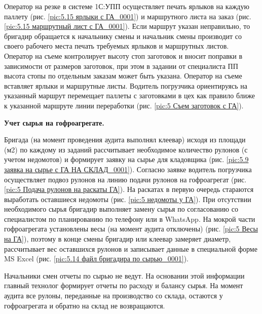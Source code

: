 Оператор на резке в системе 1С:УПП осуществляет печать ярлыков на каждую паллету (рис. \ref{pic:5.15 ярлыки с ГА_0001}) и маршрутного листа на заказ (рис. \ref{pic:5.15 маршрутный лист с ГА_0001}). Если маршрут указан неправильно, то бригадир обращается к начальнику смены и начальник смены производит со своего рабочего места печать требуемых ярлыков и маршрутных листов. Оператор на съеме контролирует высоту стоп заготовок и вносит поправки в зависимости от размеров заготовок, при этом в задании от специалиста ПП высота стопы по отдельным заказам может быть указана. Оператор на съеме вставляет ярлыки и маршрутные листы. Водитель погрузчика ориентируясь на указанный маршрут перемещает паллеты с заготовками в цех как правило ближе к указанной маршруте линии переработки (рис. \ref{pic:5 Съем заготовок с ГА}).



\textbf{Учет сырья на гофроагрегате.}

Бригада (на момент проведения аудита выполнял клеевар) исходя из площади (м2) по каждому из заданий рассчитывает необходимое количество рулонов (с учетом недомотов) и формирует заявку на сырье для кладовщика (рис. \ref{pic:5.9 заявка на сырье с ГА НА СКЛАД_0001}). Согласно заявке водитель погрузчика осуществляет подвоз рулонов на линию подачи рулонов на гофроагрегат (рис. \ref{pic:5 Подача рулонов на раскаты ГА}). На раскатах в первую очередь стараются выработать оставшиеся недомоты (рис. \ref{pic:5 недомоты у ГА}). При отсутствии необходимого сырья бригадир выполняет замену сырья по согласованию со специалистом по планированию по телефону или в WhatsApp. На мокрой части гофроагрегата установлены весы (на момент аудита отключены) (рис. \ref{pic:5 Весы на ГА}), поэтому в конце смены бригадир или клеевар замеряет диаметр, рассчитывает вес оставшихся рулонов и записывает данные в специальной форме MS Excel (рис. \ref{pic:5.14 файл бригадира по сырью_0001}). 

Начальники смен отчеты по сырью не ведут. На основании этой информации главный технолог формирует отчеты по расходу и балансу сырья. На момент аудита все рулоны, переданные на производство со склада, остаются у гофроагрегата и обратно на склад не возвращаются.  %
 


